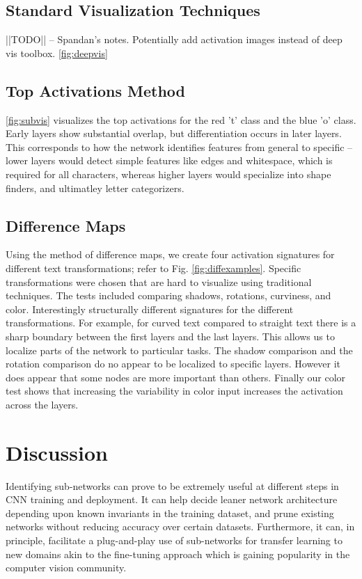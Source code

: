 \documentclass[10pt,twocolumn,letterpaper]{article}
\begin{document}
\subsection{Standard Visualization Techniques}
||TODO|| -- Spandan's notes. Potentially add activation images instead of deep vis toolbox.
\ref{fig:deepvis}

\subsection{Top Activations Method}
\ref{fig:subvis} visualizes the top activations for the red 't' class and the blue 'o' class. Early layers show substantial overlap, but differentiation occurs in later layers. This corresponds to how the network identifies features from general to specific -- lower layers would detect simple features like edges and whitespace, which is required for all characters, whereas higher layers would specialize into shape finders, and ultimatley letter categorizers. 

\subsection{Difference Maps}
Using the method of difference maps, we create four activation signatures for different text transformations; refer to Fig. \ref{fig:diffexamples}. Specific transformations were chosen that are hard to visualize using traditional techniques. The tests included comparing shadows, rotations, curviness, and color. Interestingly structurally different signatures for the different transformations. For example, for curved text compared to straight text there is a sharp boundary between the first layers and the last layers. This allows us to localize parts of the network to particular tasks. The shadow comparison and the rotation comparison do no appear to be localized to specific layers. However it does appear that some nodes are more important than others. Finally our color test shows that increasing the variability in color input increases the activation across the layers.




\section{Discussion}
Identifying sub-networks can prove to be extremely useful at different steps in CNN training and deployment. It can help decide leaner network architecture depending upon known invariants in the training dataset, and prune existing networks without reducing accuracy over certain datasets. Furthermore, it can, in principle, facilitate a plug-and-play use of sub-networks for transfer learning to new domains akin to the fine-tuning approach which is gaining popularity in the computer vision community.
\end{document}
